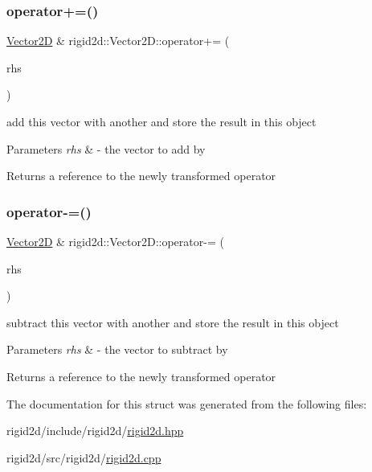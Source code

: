 \subsubsection{\texorpdfstring{operator+=()}{operator+=()}}
{\footnotesize\ttfamily \hyperlink{structrigid2d_1_1Vector2D}{Vector2D} \& rigid2d\+::\+Vector2\+D\+::operator+= (\begin{DoxyParamCaption}\item[{const \hyperlink{structrigid2d_1_1Vector2D}{Vector2D} \&}]{rhs }\end{DoxyParamCaption})}



add this vector with another and store the result in this object 


\begin{DoxyParams}{Parameters}
{\em rhs} & -\/ the vector to add by \\
\hline
\end{DoxyParams}
\begin{DoxyReturn}{Returns}
a reference to the newly transformed operator 
\end{DoxyReturn}
\mbox{\label{structrigid2d_1_1Vector2D_a8ef35cca4a51ecd76bee8b8dca5e3a63}} 
\subsubsection{\texorpdfstring{operator-\/=()}{operator-=()}}
{\footnotesize\ttfamily \hyperlink{structrigid2d_1_1Vector2D}{Vector2D} \& rigid2d\+::\+Vector2\+D\+::operator-\/= (\begin{DoxyParamCaption}\item[{const \hyperlink{structrigid2d_1_1Vector2D}{Vector2D} \&}]{rhs }\end{DoxyParamCaption})}



subtract this vector with another and store the result in this object 


\begin{DoxyParams}{Parameters}
{\em rhs} & -\/ the vector to subtract by \\
\hline
\end{DoxyParams}
\begin{DoxyReturn}{Returns}
a reference to the newly transformed operator 
\end{DoxyReturn}


The documentation for this struct was generated from the following files\+:\begin{DoxyCompactItemize}
\item 
rigid2d/include/rigid2d/\hyperlink{rigid2d_8hpp}{rigid2d.\+hpp}\item 
rigid2d/src/rigid2d/\hyperlink{rigid2d_8cpp}{rigid2d.\+cpp}\end{DoxyCompactItemize}
